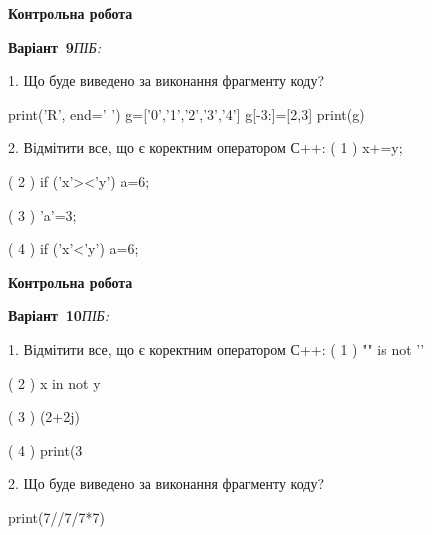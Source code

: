 \documentclass[11pt]{article}
\begin{document}
\newpage

\newpage

{\large\textbf{Контрольна робота}}

\textbf{Варіант \No\,9}\hfill \textit{ПІБ:}\,\underline{\hspace{60mm}}
\vspace{4mm}

1. Що буде виведено за виконання фрагменту коду?

print('R', end=' ')
g=['0','1','2','3','4']
g[-3:]=[2,3]
print(g)


2. %
Відмітити все, що є коректним оператором С++:
( 1 ) x+=y;

( 2 ) if ('x'><'y') a=6;

( 3 ) 'a'=3;

( 4 ) if ('x'<'y') a=6;



\newpage

\newpage

{\large\textbf{Контрольна робота}}

\textbf{Варіант \No\,10}\hfill \textit{ПІБ:}\,\underline{\hspace{60mm}}
\vspace{4mm}

1. %
Відмітити все, що є коректним оператором С++:
( 1 ) "\n" is not '\n'

( 2 ) x in not y

( 3 ) (2+2j)%

( 4 ) print(3%

2. Що буде виведено за виконання фрагменту коду?

print(7//7/7*7)



\newpage
\end{document}

